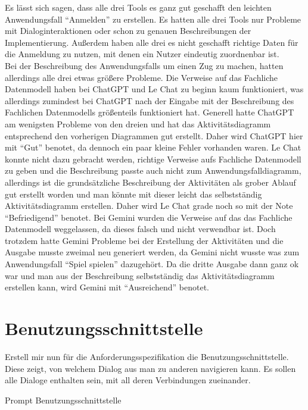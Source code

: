 Es lässt sich sagen, dass alle drei Tools es ganz gut geschafft den leichten Anwendungsfall ``Anmelden'' zu erstellen. Es hatten alle drei Tools nur Probleme mit 
Dialoginteraktionen oder schon zu genauen Beschreibungen der Implementierung. Außerdem haben alle drei es nicht geschafft richtige 
Daten für die Anmeldung zu nutzen, mit denen ein Nutzer eindeutig zuordnenbar ist.\\
Bei der Beschreibung des Anwendungsfalls um einen Zug zu machen, hatten allerdings alle drei etwas größere Probleme. Die Verweise auf das Fachliche 
Datenmodell haben bei ChatGPT und Le Chat zu beginn kaum funktioniert, was allerdings zumindest bei ChatGPT nach der Eingabe mit der Beschreibung des 
Fachlichen Datenmodells größenteils funktioniert hat. Generell hatte ChatGPT am wenigsten Probleme von den dreien und hat das Aktivitätsdiagramm entsprechend 
den vorherigen Diagrammen gut erstellt. Daher wird ChatGPT hier mit ``Gut'' benotet, da dennoch ein paar kleine Fehler vorhanden waren. Le Chat konnte nicht 
dazu gebracht werden, richtige Verweise aufs Fachliche Datenmodell zu geben und die Beschreibung passte auch nicht zum Anwendungsfalldiagramm,
allerdings ist die grundsätzliche Beschreibung der Aktivitäten als grober Ablauf gut erstellt worden 
und man könnte mit dieser leicht das selbstständig Aktivitätsdiagramm erstellen. Daher wird Le Chat grade noch so mit der Note ``Befriedigend'' benotet. 
Bei Gemini wurden die Verweise auf das das Fachliche Datenmodell weggelassen, da dieses falsch und nicht verwendbar ist. Doch trotzdem 
hatte Gemini Probleme bei der Erstellung der Aktivitäten und die Ausgabe musste zweimal neu generiert werden, da Gemini nicht wusste was zum Anwendungsfall
``Spiel spielen'' dazugehört. Da die dritte Ausgabe dann ganz ok war und man aus der Beschreibung selbstständig das Aktivitätsdiagramm erstellen kann, 
wird Gemini mit ``Ausreichend'' benotet.

\section*{Benutzungsschnittstelle}

\begin{prompt}[H]
    \begin{tcolorbox}[colback=gray!20, colframe=gray!20, boxrule=0pt, sharp corners] 
        Erstell mir nun für die Anforderungsspezifikation die Benutzungsschnittstelle. Diese zeigt, von welchem Dialog aus man zu anderen 
        navigieren kann. Es sollen alle Dialoge enthalten sein, mit all deren Verbindungen zueinander.
        \vfill
    \end{tcolorbox}
    \caption{Prompt Benutzungsschnittstelle}
    \label{Prompt Benutzungsschnittstelle}
\end{prompt}

